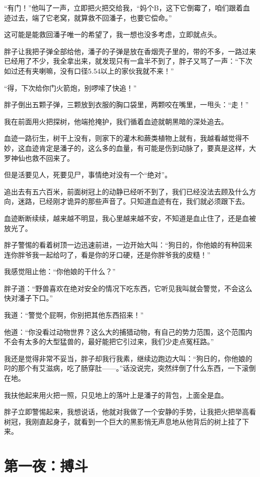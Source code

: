 “有门！”他叫了一声，立即把火把交给我，“妈个B，这下它倒霉了，咱们跟着血迹过去，端了它老窝，就算救不回潘子，也要它偿命。”

这可能是能救回潘子唯一的希望了，我一想也没多考虑，立即就点头。

胖子让我把子弹全部给他，潘子的子弹是放在香烟壳子里的，带的不多，一路过来已经用了不少，我全拿出来，就发现只有一盒半不到了，胖子又骂了一声：“下次如过还有夹喇嘛，没有口径5.54以上的家伙我就不来！”

“得，下次给你门火箭炮，别啰嗦了快追！”

胖子倒出五颗子弹，三颗放到衣服的胸口袋里，两颗咬在嘴里，一甩头：“走！”

我在前面用火把探树，他端抢掩护，我们循着血迹就朝黑暗的深处追去。

血迹一路衍生，树干上没有，则家下的灌木和蕨类植物上就有，我越看越觉得不妙，这血迹肯定是潘子的，这么多的血量，有可能是伤到动脉了，要真是这样，大罗神仙也救不回来了。

但是活要见人，死要见尸，事情绝对没有一个“绝对”。

追出去有五六百米，前面树冠上的动静已经听不到了，我们已经没法去顾及什么方向，迷路，已经刚才诡异的那些声音了。只知道血迹有在，我们就必须跟下去。

血迹断断续续，越来越不明显，我心里越来越不安，不知道是血止住了，还是血被放光了。

胖子警惕的看着树顶一边迅速前进，一边开始大叫：“狗日的，你他娘的有种回来连你胖爷我一起给叼了，看是你的牙口硬，还是你胖爷我的皮糙！”

我感觉阻止他：“你他娘的干什么？”

胖子道：“野兽喜欢在绝对安全的情况下吃东西，它听见我叫就会警觉，不会这么快对潘子下口。”

我道：“警觉个屁啊，你别把其他东西招来！”

他道：“你没看过动物世界？这么大的捕猎动物，有自己的势力范围，这个范围内不会有太多的大型猛兽的，最好能把它引过来，我们少走点冤枉路。”

我还是觉得非常不妥当，胖子却我行我素，继续边跑边大叫：“狗日的，你他娘的叼的那个有艾滋病，吃了肠穿肚——。”话没说完，突然绊倒了什么东西，一下滚倒在地。

我扶他起来用火把一照，只见地上的落叶上是潘子的背包，上面全是血。

胖子立即警惕起来，我想说话，他就对我做了一个安静的手势，让我把火把举高看树冠，我刚直起身子，就看到一个巨大的黑影悄无声息地从他背后的树上挂了下来。

\chapter{第一夜：搏斗}


